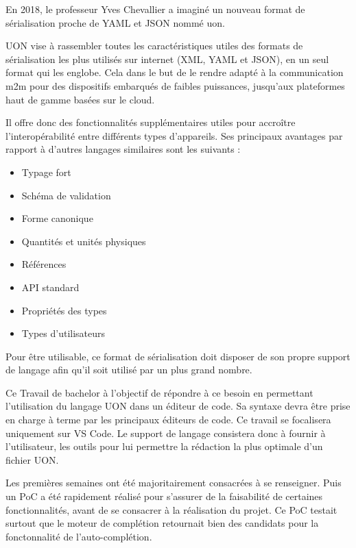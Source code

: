 
En 2018, le professeur Yves Chevallier a imaginé un nouveau format de sérialisation proche de YAML et JSON nommé \Gls{uon}.

UON vise à rassembler toutes les caractéristiques utiles des formats de sérialisation les plus utilisés sur internet (XML, YAML et JSON),
en un seul format qui les englobe. Cela dans le but de le rendre adapté à la communication \Gls{m2m} pour des dispositifs embarqués de faibles puissances, jusqu'aux plateformes haut de gamme basées sur le cloud.

Il offre donc des fonctionnalités supplémentaires utiles pour accroître l'interopérabilité entre différents types d'appareils. Ses principaux avantages par rapport à d'autres langages similaires sont les suivants :

\begin{itemize}
    \item Typage fort
    \item Schéma de validation
    \item Forme canonique
    \item Quantités et unités physiques
    \item Références
    \item API standard
    \item Propriétés des types
    \item Types d'utilisateurs
\end{itemize}

Pour être utilisable, ce format de sérialisation doit disposer de son propre support de langage afin qu'il soit utilisé par un plus grand nombre.

Ce Travail de bachelor à l'objectif de répondre à ce besoin en permettant l'utilisation du langage UON dans un éditeur de code.
Sa syntaxe devra être prise en charge à terme par les principaux éditeurs de code. Ce travail se focalisera uniquement sur VS Code.
Le support de langage consistera donc à fournir à l'utilisateur, les outils pour lui permettre la rédaction la plus optimale d'un fichier UON.

Les premières semaines ont été majoritairement consacrées à se renseigner.
Puis un \Gls{PoC} a été rapidement réalisé pour s'assurer de la faisabilité de certaines fonctionnalités, avant de se consacrer à la réalisation du projet.
Ce PoC testait surtout que le moteur de complétion retournait bien des candidats pour la fonctonnalité de l'auto-complétion.

